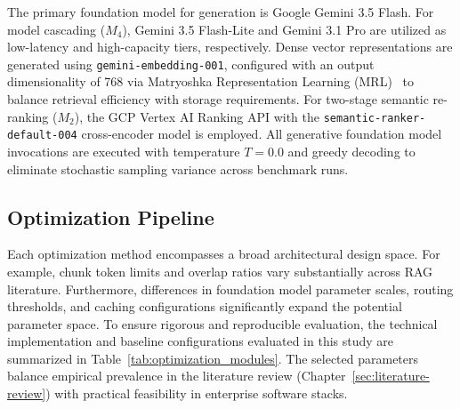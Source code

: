 The primary foundation model for generation is Google Gemini 3.5 Flash. For model cascading ($M_4$), Gemini 3.5 Flash-Lite and Gemini 3.1 Pro are utilized as low-latency and high-capacity tiers, respectively. Dense vector representations are generated using \texttt{gemini-embedding-001}, configured with an output dimensionality of 768 via Matryoshka Representation Learning (MRL)~\citep{MRL2022} to balance retrieval efficiency with storage requirements. For two-stage semantic re-ranking ($M_2$), the GCP Vertex AI Ranking API with the \texttt{semantic-ranker-default-004} cross-encoder model is employed. All generative foundation model invocations are executed with temperature $T = 0.0$ and greedy decoding to eliminate stochastic sampling variance across benchmark runs.

\subsection{Optimization Pipeline}
\label{subsec:opt_pipeline}

Each optimization method encompasses a broad architectural design space. For example, chunk token limits and overlap ratios vary substantially across RAG literature. Furthermore, differences in foundation model parameter scales, routing thresholds, and caching configurations significantly expand the potential parameter space. To ensure rigorous and reproducible evaluation, the technical implementation and baseline configurations evaluated in this study are summarized in Table~\ref{tab:optimization_modules}. The selected parameters balance empirical prevalence in the literature review (Chapter~\ref{sec:literature-review}) with practical feasibility in enterprise software stacks.

